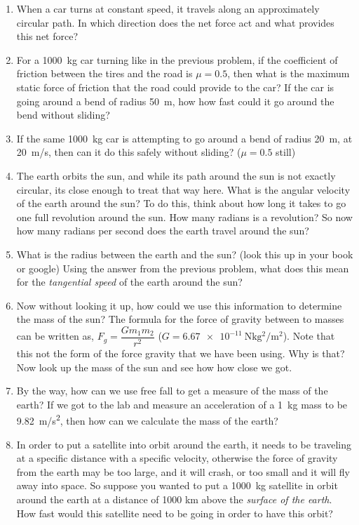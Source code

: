 \begin{enumerate}
	\item When a car turns at constant speed, it travels along an approximately circular path. In which direction does the net force act and what provides this net force?
	
	\item For a \SI{1000}{kg} car turning like in the previous problem, if the coefficient of friction between the tires and the road is $\mu=0.5$, then what is the maximum static force of friction that the road could provide to the car? If the car is going around a bend of radius \SI{50}{\meter}, how how fast could it go around the bend without sliding?
	
	\item If the same \SI{1000}{\kilogram} car is attempting to go around a bend of radius \SI{20}{\meter}, at \SI{20}{m/s}, then can it do this safely without sliding? ($\mu = 0.5$ still)
	
	\item The earth orbits the sun, and while its path around the sun is not exactly circular, its close enough to treat that way here. What is the angular velocity of the earth around the sun? To do this, think about how long it takes to go one full revolution around the sun. How many radians is a revolution? So now how many radians per second does the earth travel around the sun? 
	\item What is the radius between the earth and the sun? (look this up in your book or google) Using the answer from the previous problem, what does this mean for the \emph{tangential speed} of the earth around the sun?
	\item Now without looking it up, how could we use this information to determine the mass of the sun?  The formula for the force of gravity between to masses can be written as, $F_g=\dfrac{G m_1 m_2}{r^2}$ ($G=\SI{6.67e-11}{\newton \kilogram^2/\meter^2}$). Note that this not the form of the force gravity that we have been using. Why is that? Now look up the mass of the sun and see how how close we got.
	\item By the way, how can we use free fall to get a measure of the mass of the earth? If we got to the lab and measure an acceleration of a \SI{1}{\kilogram} mass to be \SI{9.82}{m/s^2}, then how can we calculate the mass of the earth?
	
	\item In order to put a satellite into orbit around the earth, it needs to be traveling at a specific distance with a specific velocity, otherwise the force of gravity from the earth may be too large, and it will crash, or too small and it will fly away into space. So suppose you wanted to put a \SI{1000}{kg} satellite in orbit around the earth at a distance of 1000 km above the \emph{surface of the earth}. How fast would this satellite need to be going in order to have this orbit?
	

\end{enumerate}
